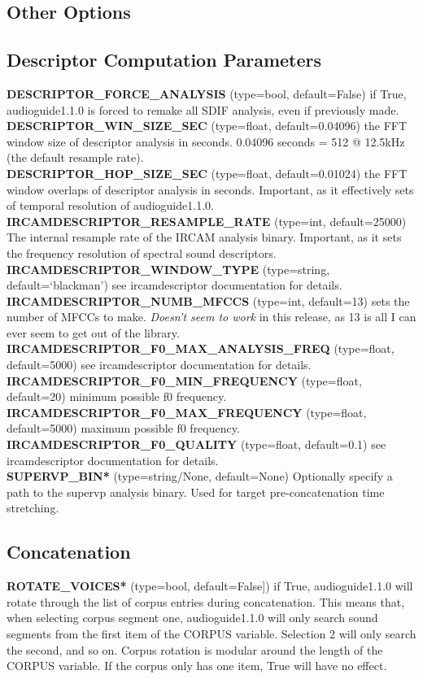 \documentclass{article}
\newcommand{\optEntry}[4]{\textbf{#1} (type={\color{red}#2}, default={\color{ForestGreen}#3}) #4\hspace{0.5em}\\}
\newcommand{\ag}{audioguide1.1.0\xspace}
\begin{document}
\begin{spacing}{1.2}
\section{Other Options}\label{otheroptions}
\subsection{Descriptor Computation Parameters}
\optEntry{DESCRIPTOR\_FORCE\_ANALYSIS}{bool}{False}{if True, \ag is forced to remake all SDIF analysis, even if previously made.}

\optEntry{DESCRIPTOR\_WIN\_SIZE\_SEC}{float}{0.04096}{the FFT window size of descriptor analysis in seconds.  0.04096 seconds = 512 @ 12.5kHz (the default resample rate).}

\optEntry{DESCRIPTOR\_HOP\_SIZE\_SEC}{float}{0.01024}{the FFT window overlaps of descriptor analysis in seconds.  Important, as it effectively sets of temporal resolution of \ag.}

\optEntry{IRCAMDESCRIPTOR\_RESAMPLE\_RATE}{int}{25000}{The internal resample rate of the IRCAM analysis binary.  Important, as it sets the frequency resolution of spectral sound descriptors.}

\optEntry{IRCAMDESCRIPTOR\_WINDOW\_TYPE}{string}{`blackman'}{see ircamdescriptor documentation for details.}

\optEntry{IRCAMDESCRIPTOR\_NUMB\_MFCCS}{int}{13}{sets the number of MFCCs to make.  \emph{Doesn't seem to work} in this release, as 13 is all I can ever seem to get out of the library.}

\optEntry{IRCAMDESCRIPTOR\_F0\_MAX\_ANALYSIS\_FREQ}{float}{5000}{see ircamdescriptor documentation for details.}

\optEntry{IRCAMDESCRIPTOR\_F0\_MIN\_FREQUENCY}{float}{20}{minimum possible f0 frequency.}

\optEntry{IRCAMDESCRIPTOR\_F0\_MAX\_FREQUENCY}{float}{5000}{maximum possible f0 frequency.}

\optEntry{IRCAMDESCRIPTOR\_F0\_QUALITY}{float}{0.1}{see ircamdescriptor documentation for details.}

\optEntry{SUPERVP\_BIN*}{string/None}{None}{Optionally specify a path to the supervp analysis binary.  Used for target pre-concatenation time stretching.}



\subsection{Concatenation}
\optEntry{ROTATE\_VOICES*}{bool}{False]}{if True, \ag will rotate through the list of corpus entries during concatenation.  This means that, when selecting corpus segment one, \ag will only search sound segments from the first item of the CORPUS variable.  Selection 2 will only search the second, and so on.  Corpus rotation is modular around the length of the CORPUS variable.  If the corpus only has one item, True will have no effect.}


\end{spacing}
\end{document}
